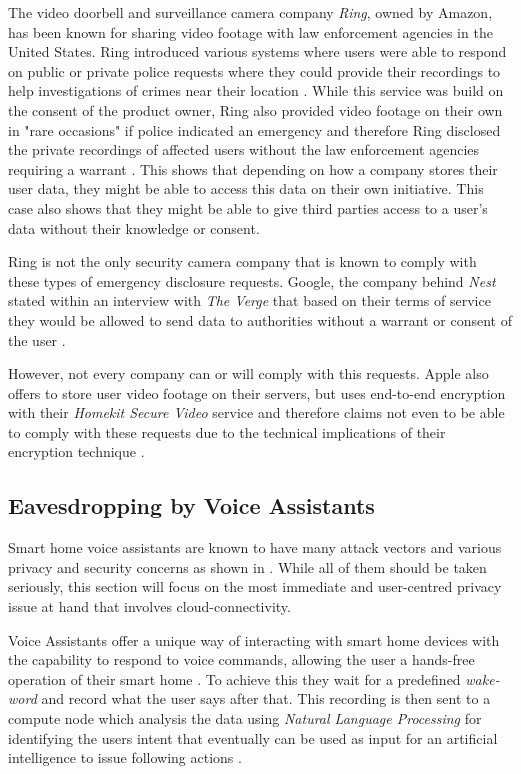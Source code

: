 The video doorbell and surveillance camera company \textit{Ring}, owned by Amazon, has been known for sharing video footage with law enforcement agencies in the United States. Ring introduced various systems where users were able to respond on public or private police requests where they could provide their recordings to help investigations of crimes near their location \cite{Kaur2024Ring}. While this service was build on the consent of the product owner, Ring also provided video footage on their own in "rare occasions" if police indicated an emergency and therefore Ring disclosed the private recordings of affected users without the law enforcement agencies requiring a warrant \cite{Kaur2024Ring}. This shows that depending on how a company stores their user data, they might be able to access this data on their own initiative. This case also shows that they might be able to give third parties access to a user's data without their knowledge or consent.

Ring is not the only security camera company that is known to comply with these types of emergency disclosure requests. Google, the company behind \textit{Nest} stated within an interview with \textit{The Verge} that based on their terms of service they would be allowed to send data to authorities without a warrant or consent of the user \cite{Clark2022Nest}.

However, not every company can or will comply with this requests. Apple also offers to store user video footage on their servers, but uses end-to-end encryption with their \textit{Homekit Secure Video} service \cite{Kastrenakes2019HKSC} and therefore claims not even to be able to comply with these requests due to the technical implications of their encryption technique \cite{Clark2022Nest}.

\subsection{Eavesdropping by Voice Assistants}
Smart home voice assistants are known to have many attack vectors and various privacy and security concerns as shown in \cite{SHPA-10.1145/3412383}. While all of them should be taken seriously, this section will focus on the most immediate and user-centred privacy issue at hand that involves cloud-connectivity.

Voice Assistants offer a unique way of interacting with smart home devices with the capability to respond to voice commands, allowing the user a hands-free operation of their smart home \cite{SHPA-10.1145/3412383}. To achieve this they wait for a predefined \textit{wake-word} and record what the user says after that. This recording is then sent to a compute node which analysis the data using \textit{Natural Language Processing} for identifying the users intent that eventually can be used as input for an artificial intelligence to issue following actions \cite{SHPA-10.1145/3412383}.


